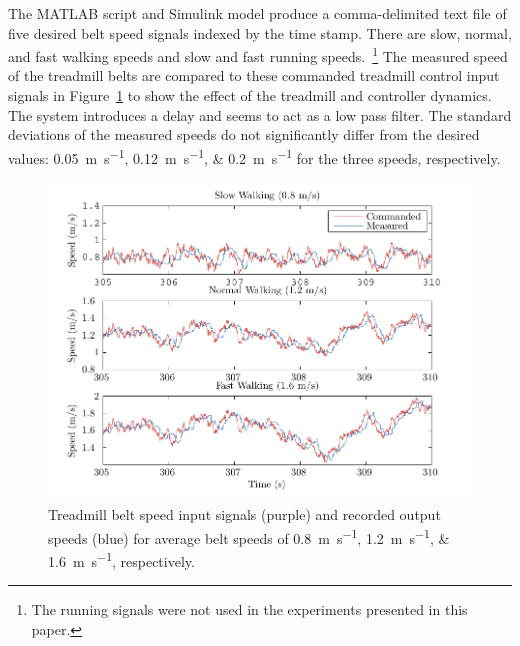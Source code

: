 \documentclass[fleqn,12pt]{wlpeerj}
\begin{document}
The MATLAB script and Simulink model produce a comma-delimited text file of
five desired belt speed signals indexed by the time stamp. There are slow, normal,
and fast walking speeds and slow and fast running speeds.~\footnote{The running
signals were not used in the experiments presented in this paper.} The measured
speed of the treadmill belts are compared to these commanded treadmill control
input signals in Figure~\ref{fig:input_output} to show the effect of the
treadmill and controller dynamics. The system introduces a delay and seems to
act as a low pass filter. The standard deviations of the measured speeds do not
significantly differ from the desired values:
\SIlist{0.05;0.12;0.2}{\meter\per\second} for the three speeds, respectively.
%
\begin{figure}
  \centering
  \includegraphics{figures/input_vs_output.pdf}
  \caption{Treadmill belt speed input signals (purple) and recorded output
    speeds (blue) for average belt speeds of
    \SIlist{0.8;1.2;1.6}{\meter\per\second}, respectively.}
  \label{fig:input_output}
\end{figure}
\end{document}
